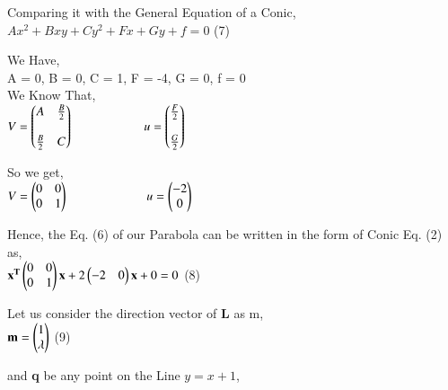 \documentclass[journal,12pt,twocolumn]{IEEEtran}
\begin{document}
\vspace{0.4cm}
\raggedright
Comparing it with the General Equation of a Conic,\\
\vspace{0.25cm}
\centering
$Ax^2 + Bxy + Cy^2 + Fx + Gy + f = 0$ \hspace{0.5cm}(7)\\
\vspace{0.25cm}
\raggedright
We Have,\\
\vspace{0.25cm}
A = 0, B = 0, C = 1, F = -4, G = 0, f = 0\\
\vspace{0.25cm}
We Know That,\\
\vspace{0.25cm}
\centering
$ V = \begin{pmatrix}A&\frac{B}{2}\\\\\frac{B}{2}&C\end{pmatrix} \hspace{2cm} u = \begin{pmatrix}\frac{F}{2}\\\\\frac{G}{2}\end{pmatrix} $\\
\vspace{0.25cm}
\raggedright
So we get,\\
\vspace{0.25cm}
\centering
$ V = \begin{pmatrix}0&0\\0&1\end{pmatrix} \hspace{2.2cm} u = \begin{pmatrix}-2\\0\end{pmatrix} $ \\
\vspace{0.25cm}
\raggedright
Hence, the Eq. (6) of our Parabola can be written in the form of Conic Eq. (2) as,\\
\vspace{0.25cm}
\centering
$\mathbf{x^T} \begin{pmatrix}0&0\\0&1\end{pmatrix}\mathbf{x} + 2 \begin{pmatrix}-2&0\end{pmatrix} \mathbf{x} + 0 = 0$ \hspace{0.5cm} (8)\\ 
\vspace{0.25cm}
\raggedright
Let us consider the direction vector of \textbf{L} as m,\\
\vspace{0.25cm}
\centering
$ \mathbf{m} = \begin{pmatrix}1\\ \lambda\end{pmatrix}$ \hspace{1cm} (9)\\
\vspace{0.25cm}
\raggedright
and \textbf{q} be any point on the Line $y = x + 1$,\\
\vspace{0.25cm}
\end{document}
